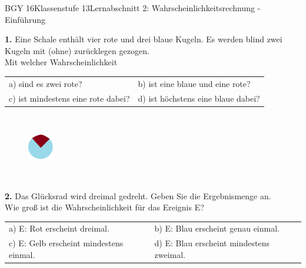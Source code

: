 \documentclass[oneside,openany,headings=optiontotoc,11pt,numbers=noenddot]{scrreprt}
\begin{document}
\begin{worksheet}{BGY 16}{Klassenstufe 13}{Lernabschnitt 2: Wahrscheinlichkeitsrechnung - Einführung}
		\par\noindent
		\textbf{1.} Eine Schale enthält vier rote und drei blaue Kugeln. Es werden blind zwei Kugeln mit (ohne) zurücklegen gezogen.\\
		Mit welcher Wahrscheinlichkeit\\
		\par\noindent
		\begin{tabularx}{\textwidth}{XX}
			a) sind es zwei rote? & b) ist eine blaue und eine rote?\\
			c) ist mindestens eine rote dabei? & d) ist höchstens eine blaue dabei?
		\end{tabularx}\\
		\begin{figure}
			\includegraphics[width=0.1\textwidth]{../99_Bilder/04_WKR/scheibe.png}
		\end{figure}\\
		\par\noindent
		\textbf{2.} Das Glücksrad wird dreimal gedreht. Geben Sie die Ergebnismenge an.\\
		Wie groß ist die Wahrscheinlichkeit für das Ereignis E?\\
		\par\noindent
		\begin{tabularx}{\textwidth}{XX}
			\\
			a) E: \glqq{}Rot erscheint dreimal.\grqq{} & b) E: \glqq{}Blau erscheint genau einmal.\grqq{}\\
			c) E: \glqq{}Gelb erscheint mindestens einmal.\grqq{} & d) E: \glqq{}Blau erscheint mindestens zweimal.\grqq{}
		\end{tabularx}\\
		\par\noindent
	\end{worksheet}
\end{document}
